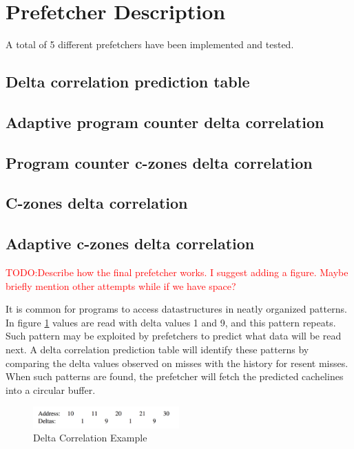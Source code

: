 \documentclass[a4paper]{IEEEtran}
\newcommand\TODO[1]{\textcolor{red}{TODO:#1}}
\newcommand\todo[1]{\TODO{#1}}
\begin{document}
\section{Prefetcher Description}
A total of 5 different prefetchers have been implemented and tested. 

\subsection{Delta correlation prediction table}


\subsection{Adaptive program counter delta correlation}

\subsection{Program counter c-zones delta correlation}

\subsection{C-zones delta correlation}

\subsection{Adaptive c-zones delta correlation}

\todo{Describe how the final prefetcher works. I suggest adding a figure. Maybe briefly mention other attempts while if we have space?}

It is common for programs to access datastructures in neatly organized patterns.
In figure \ref{fig:DCExample} values are read with delta values 1 and 9, and this pattern repeats.
Such pattern may be exploited by prefetchers to predict what data will be read next.
A delta correlation prediction table will identify these patterns by comparing the delta values observed on misses with the history for resent misses.
When such patterns are found, the prefetcher will fetch the predicted cachelines into a circular buffer.


\begin{figure}[h!]
  \centering
      \includegraphics[width=0.5\textwidth]{Figures/DCExample}
  \caption{Delta Correlation Example}
  \label{fig:DCExample}
\end{figure}
\end{document}
